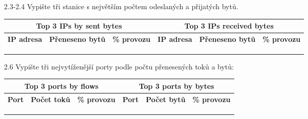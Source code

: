 \documentclass[a4paper,11pt]{article}
\begin{document}
\begin{itemize} 
\item[2.3-2.4] Vypište tři stanice s největším počtem odeslaných a přijatých bytů.  

\begin{tabular}{|p{2cm}|p{3cm}|c||p{2cm}|p{3cm}|c|}
  \hline
  \multicolumn{3}{|c||}{\bf Top 3 IPs by sent bytes} & \multicolumn{3}{|c|}{\bf Top 3 IPs received bytes} \\\hline
\bf IP adresa  & \bf Přeneseno bytů  &  \bf\% provozu & \bf IP adresa  & \bf Přeneseno bytů  & \bf \% provozu \\ \hline
      &                 &           &&&   \\   \hline
      &                 &           &&&   \\  \hline
      &                 &           &&&   \\   \hline
\end{tabular}

\item[2.6] Vypište tři nejvytíženější porty podle počtu přenesených toků a bytů: 

\begin{tabular}{|p{2cm}|p{3cm}|c||p{2cm}|p{3cm}|c|}
\hline
  \multicolumn{3}{|c||}{\bf Top 3 ports by flows} & \multicolumn{3}{|c|}{\bf Top 3 ports by bytes} \\\hline
\bf Port  & \bf Počet toků  & \bf \% provozu & \bf Port & \bf Počet bytů & \bf \% provozu \\ \hline
      &                  &       &&& \\  \hline
      &                  &       &&& \\  \hline
      &                  &       &&& \\  \hline
\end{tabular}
\end{itemize}
\end{document}
